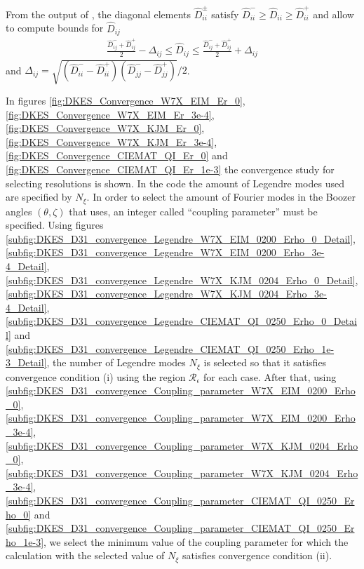 From the output of {\DKES}, the diagonal elements $\widehat{D}_{ii}^{\pm}$ satisfy $\widehat{D}_{ii}^{-} \ge \widehat{D}_{ii} \ge\widehat{D}_{ii}^{+}$ and allow to compute bounds for $\widehat{D}_{ij}$
%
\begin{align}
	\frac{\widehat{D}_{ij}^{-} + \widehat{D}_{ij}^{+}}{2}
	-
	\Delta_{ij}
	\le
	\widehat{D}_{ij}
	\le
	\frac{\widehat{D}_{ij}^{-} + \widehat{D}_{ij}^{+}}{2}
	+
	\Delta_{ij}
\end{align}
and $\Delta_{ij} = \sqrt{(\widehat{D}_{ii}^{-} - \widehat{D}_{ii}^{+})(\widehat{D}_{jj}^{-} - \widehat{D}_{jj}^{+})} /2 $.  

 In figures \ref{fig:DKES_Convergence_W7X_EIM_Er_0}, \ref{fig:DKES_Convergence_W7X_EIM_Er_3e-4}, \ref{fig:DKES_Convergence_W7X_KJM_Er_0}, \ref{fig:DKES_Convergence_W7X_KJM_Er_3e-4}, \ref{fig:DKES_Convergence_CIEMAT_QI_Er_0} and \ref{fig:DKES_Convergence_CIEMAT_QI_Er_1e-3} the convergence study for selecting {\DKES} resolutions is shown. In the code {\DKES} the amount of Legendre modes used are specified by $N_\xi$. In order to select the amount of Fourier modes in the Boozer angles $(\theta,\zeta)$ that {\DKES} uses, an integer called ``coupling parameter'' must be specified. Using figures \ref{subfig:DKES_D31_convergence_Legendre_W7X_EIM_0200_Erho_0_Detail}, \ref{subfig:DKES_D31_convergence_Legendre_W7X_EIM_0200_Erho_3e-4_Detail}, \ref{subfig:DKES_D31_convergence_Legendre_W7X_KJM_0204_Erho_0_Detail}, \ref{subfig:DKES_D31_convergence_Legendre_W7X_KJM_0204_Erho_3e-4_Detail}, \ref{subfig:DKES_D31_convergence_Legendre_CIEMAT_QI_0250_Erho_0_Detail} and \ref{subfig:DKES_D31_convergence_Legendre_CIEMAT_QI_0250_Erho_1e-3_Detail}, the number of Legendre modes $N_\xi$ is selected so that it satisfies convergence condition (i) using the region $\mathcal{R}_\epsilon$ for each case. After that, using \ref{subfig:DKES_D31_convergence_Coupling_parameter_W7X_EIM_0200_Erho_0}, \ref{subfig:DKES_D31_convergence_Coupling_parameter_W7X_EIM_0200_Erho_3e-4}, \ref{subfig:DKES_D31_convergence_Coupling_parameter_W7X_KJM_0204_Erho_0}, \ref{subfig:DKES_D31_convergence_Coupling_parameter_W7X_KJM_0204_Erho_3e-4}, \ref{subfig:DKES_D31_convergence_Coupling_parameter_CIEMAT_QI_0250_Erho_0} and \ref{subfig:DKES_D31_convergence_Coupling_parameter_CIEMAT_QI_0250_Erho_1e-3}, we select the minimum value of the coupling parameter for which the calculation with the selected value of $N_\xi$ satisfies convergence condition (ii).
 
 
%
%
%
%
%


